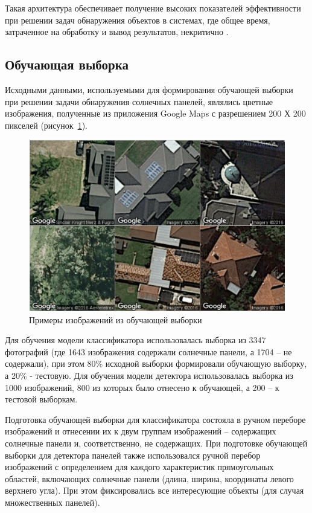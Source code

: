 Такая архитектура обеспечивает получение высоких показателей эффективности при решении задач обнаружения объектов в системах, где общее время, затраченное на обработку и вывод результатов, некритично \cite[c.~29]{Golovko2018}.

\subsection{Обучающая выборка}
Исходными данными, используемыми для формирования обучающей выборки при решении задачи обнаружения солнечных панелей, являлись цветные изображения, полученные из приложения Google Maps с разрешением 200 Х 200 пикселей (рисунок~\ref{fig:google_maps}).

\begin{figure}[ht]
	\centering
	\includegraphics[width=12cm]{man-source/images/ch4/pic4-17.png}
	\caption{Примеры изображений из обучающей выборки}
	\label{fig:google_maps}
\end{figure}

Для обучения модели классификатора использовалась выборка из 3347 фотографий (где 1643 изображения содержали солнечные панели, а 1704 -- не содержали), при этом 80\% исходной выборки формировали обучающую выборку, а 20\% - тестовую. Для обучения модели детектора использовалась выборка из 1000 изображений, 800 из которых было отнесено к обучающей, а 200 -- к тестовой выборкам.

Подготовка обучающей выборки для классификатора состояла в ручном переборе изображений и отнесении их к двум группам изображений -- содержащих солнечные панели и, соответственно, не содержащих. При подготовке обучающей выборки для детектора панелей также использовался ручной перебор изображений с определением для каждого характеристик прямоугольных областей, включающих солнечные панели (длина, ширина, координаты левого верхнего угла). При этом фиксировались все интересующие объекты (для случая множественных панелей). 

